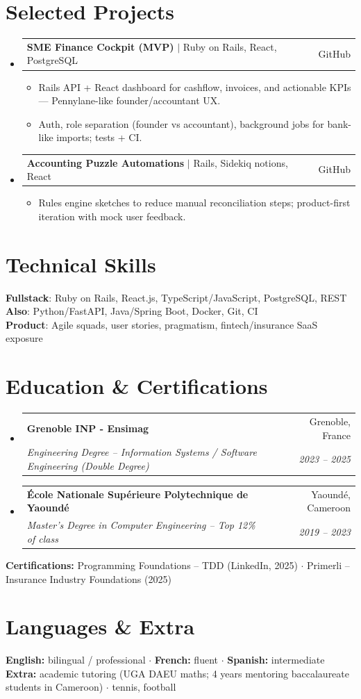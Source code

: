 \documentclass[letterpaper,10.5pt]{article}
\makeatletter
\newcommand{\resumeItem}[1]{\item\small{#1 \vspace{-1.5pt}}}
\newcommand{\resumeSubheading}[4]{
  \vspace{-1pt}\item
    \begin{tabular*}{0.97\textwidth}[t]{l@{\extracolsep{\fill}}r}
      \textbf{#1} & #2 \\
      \textit{\small#3} & \textit{\small #4} \\
    \end{tabular*}\vspace{-5pt}
}
\newcommand{\resumeProjectHeading}[2]{
    \item
    \begin{tabular*}{0.97\textwidth}{l@{\extracolsep{\fill}}r}
      \small#1 & #2 \\
    \end{tabular*}\vspace{-5pt}
}
\newcommand{\resumeSubHeadingListStart}{\begin{itemize}[leftmargin=0.15in, label={}]}
\newcommand{\resumeSubHeadingListEnd}{\end{itemize}}
\newcommand{\resumeItemListStart}{\begin{itemize}[leftmargin=0.18in]}
\newcommand{\resumeItemListEnd}{\end{itemize}\vspace{-3pt}}
\makeatother
\begin{document}
\section{Selected Projects}

\resumeSubHeadingListStart

  \resumeProjectHeading
    {\textbf{SME Finance Cockpit (MVP)} $|$ Ruby on Rails, React, PostgreSQL}{GitHub}
    \resumeItemListStart
      \resumeItem{Rails API + React dashboard for cashflow, invoices, and actionable KPIs --- Pennylane-like founder/accountant UX.}
      \resumeItem{Auth, role separation (founder vs accountant), background jobs for bank-like imports; tests + CI.}
    \resumeItemListEnd
  \resumeProjectHeading
    {\textbf{Accounting Puzzle Automations} $|$ Rails, Sidekiq notions, React}{GitHub}
    \resumeItemListStart
      \resumeItem{Rules engine sketches to reduce manual reconciliation steps; product-first iteration with mock user feedback.}
    \resumeItemListEnd
\resumeSubHeadingListEnd

\section{Technical Skills}

\begin{itemize}[leftmargin=0.15in, label={}]
  \small{\item{
\textbf{Fullstack}: Ruby on Rails, React.js, TypeScript/JavaScript, PostgreSQL, REST \\
\textbf{Also}: Python/FastAPI, Java/Spring Boot, Docker, Git, CI \\
\textbf{Product}: Agile squads, user stories, pragmatism, fintech/insurance SaaS exposure
  }}
\end{itemize}

\section{Education \& Certifications}

\resumeSubHeadingListStart
  \resumeSubheading
    {Grenoble INP - Ensimag}{Grenoble, France}
    {Engineering Degree -- Information Systems / Software Engineering (Double Degree)}{2023 -- 2025}
  \resumeSubheading
    {\'Ecole Nationale Sup\'erieure Polytechnique de Yaound\'e}{Yaound\'e, Cameroon}
    {Master's Degree in Computer Engineering -- Top 12\% of class}{2019 -- 2023}
\resumeSubHeadingListEnd
\small{
\textbf{Certifications:} Programming Foundations -- TDD (LinkedIn, 2025) $\cdot$ Primerli -- Insurance Industry Foundations (2025)
}

\section{Languages \& Extra}
\small{
\textbf{English:} bilingual / professional $\cdot$ \textbf{French:} fluent $\cdot$ \textbf{Spanish:} intermediate \\
\textbf{Extra:} academic tutoring (UGA DAEU maths; 4 years mentoring baccalaureate students in Cameroon) $\cdot$ tennis, football
}
\end{document}
